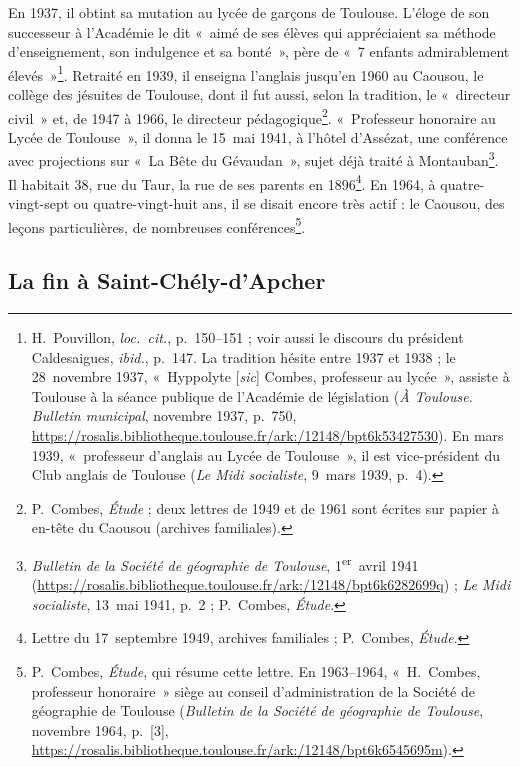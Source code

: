 En 1937, il obtint sa mutation au lycée de garçons de Toulouse. L'éloge de son successeur à l'Académie le dit «~aimé de ses élèves qui appréciaient sa méthode d'enseignement, son indulgence et sa bonté~», père de «~7 enfants admirablement élevés~»\footnote{H.~Pouvillon, \textit{loc.~cit.}, p.~150--151 ; voir aussi le discours du président Caldesaigues, \textit{ibid.}, p.~147. La tradition hésite entre 1937 et 1938 ; le 28~novembre 1937, «~Hyppolyte [\textit{sic}] Combes, professeur au lycée~», assiste à Toulouse à la séance publique de l'Académie de législation (\textit{À Toulouse. Bulletin municipal}, novembre 1937, p.~750, \url{https://rosalis.bibliotheque.toulouse.fr/ark:/12148/bpt6k53427530}). En mars 1939, «~professeur d'anglais au Lycée de Toulouse~», il est vice-président du Club anglais de Toulouse (\textit{Le Midi socialiste}, 9~mars 1939, p.~4).}. Retraité en 1939, il enseigna l'anglais jusqu'en 1960 au Caousou, le collège des jésuites de Toulouse, dont il fut aussi, selon la tradition, le «~directeur civil~» et, de 1947 à 1966, le directeur pédagogique\footnote{P.~Combes, \textit{Étude} ; deux lettres de 1949 et de 1961 sont écrites sur papier à en-tête du Caousou (archives familiales).}. «~Professeur honoraire au Lycée de Toulouse~», il donna le 15~mai 1941, à l'hôtel d'Assézat, une conférence avec projections sur «~La Bête du Gévaudan~», sujet déjà traité à Montauban\footnote{\textit{Bulletin de la Société de géographie de Toulouse}, 1\textsuperscript{er}~avril 1941 (\url{https://rosalis.bibliotheque.toulouse.fr/ark:/12148/bpt6k6282699q}) ; \textit{Le Midi socialiste}, 13~mai 1941, p.~2 ; P.~Combes, \textit{Étude}.}. Il habitait 38, rue du Taur, la rue de ses parents en 1896\footnote{Lettre du 17~septembre 1949, archives familiales ; P.~Combes, \textit{Étude}.}. En 1964, à quatre-vingt-sept ou quatre-vingt-huit ans, il se disait encore très actif : le Caousou, des leçons particulières, de nombreuses conférences\footnote{P.~Combes, \textit{Étude}, qui résume cette lettre. En 1963--1964, «~H.~Combes, professeur honoraire~» siège au conseil d'administration de la Société de géographie de Toulouse (\textit{Bulletin de la Société de géographie de Toulouse}, novembre 1964, p.~[3], \url{https://rosalis.bibliotheque.toulouse.fr/ark:/12148/bpt6k6545695m}).}.

\subsection{La fin à Saint-Chély-d'Apcher}

